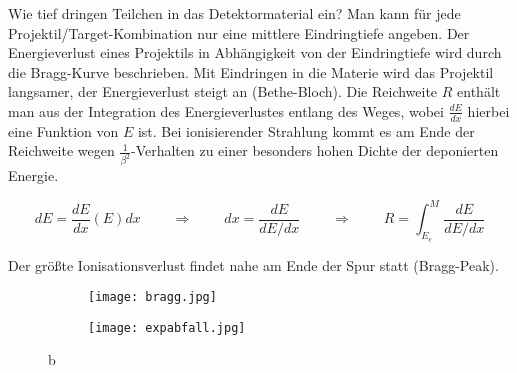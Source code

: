 Wie tief dringen Teilchen in das Detektormaterial ein? Man kann für jede
Projektil/Target-Kombination nur eine mittlere Eindringtiefe angeben. Der Energieverlust eines
Projektils in Abhängigkeit von der Eindringtiefe wird durch die Bragg-Kurve beschrieben. Mit
Eindringen in die Materie wird das Projektil langsamer, der Energieverlust steigt an
(Bethe-Bloch). Die Reichweite $R$ enthält man aus der Integration des Energieverlustes entlang des
Weges, wobei $\frac{dE}{dx}$ hierbei eine Funktion von $E$ ist. Bei ionisierender Strahlung kommt es
am Ende der Reichweite wegen $\frac{1}{\beta^2}$-Verhalten zu einer besonders hohen Dichte der
deponierten Energie.

\[dE= \frac{dE}{dx}(E)dx~~~~~~~~~~\Rightarrow~~~~~~~~~~dx
=\frac{dE}{dE/dx}~~~~~~~~~~\Rightarrow~~~~~~~~~~ R=\int_{E_c}^{M} \frac{dE}{dE/dx}  \]

Der größte Ionisationsverlust findet nahe am Ende der Spur statt (Bragg-Peak).




% 
% 

\begin{figure}[htbp]
	\begin{minipage}[b]{0.5\textwidth}
		\begin{figure}[H]
		\centering
		\texttt{[image: bragg.jpg]}
		\end{figure}
	\end{minipage}
	\hfill
	\begin{minipage}[b]{0.5\textwidth}
		\begin{figure}[H]
		\centering
		\texttt{[image: expabfall.jpg]}
		\end{figure}
	\end{minipage}
	\caption{b}
	\label{rekristall} 
\end{figure}